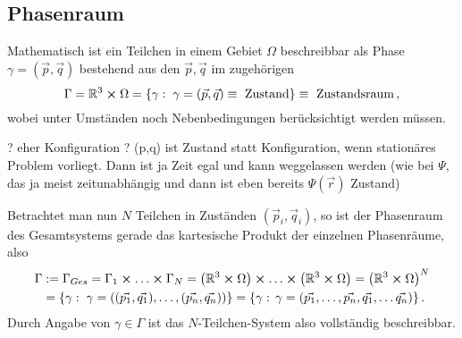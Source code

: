 \documentclass[../class_mech_main.tex]{subfiles}
\begin{document}
	\subsection{Phasenraum}
Mathematisch ist ein Teilchen in einem Gebiet $\Omega$ beschreibbar als Phase $\gamma = (\vec{p}, \vec{q})$ bestehend aus den  $\vec{p}, \vec{q}$ im zugehörigen 
\begin{equation}
\Gamma = \mathbb{R}^3 \cross \Omega = \qty{\gamma: \; \gamma = (\vec{p}, \vec{q}) \equiv \text{ Zustand}} \equiv \text{ Zustandsraum} \, ,
\end{equation}
wobei unter Umständen noch Nebenbedingungen berücksichtigt werden müssen.

? eher Konfiguration ? (p,q) ist Zustand statt Konfiguration, wenn stationäres Problem vorliegt. Dann ist ja Zeit egal und kann weggelassen werden (wie bei $\Psi$, das ja meist zeitunabhängig und dann ist eben bereits $\Psi(\vec{r})$ Zustand)



Betrachtet man nun $N$ Teilchen in Zuständen $(\vec{p}_i, \vec{q}_i)$, so ist der Phasenraum des Gesamtsystems gerade das kartesische Produkt der einzelnen Phasenräume, also
\begin{equation}
\begin{split}
\Gamma &:= \Gamma_{Ges} = \Gamma_1 \cross \dots \cross \Gamma_N = \qty(\mathbb{R}^3 \cross \Omega) \cross \dots \cross \qty(\mathbb{R}^3 \cross \Omega) = \qty(\mathbb{R}^3 \cross \Omega)^N
\\
&= \qty{\gamma: \; \gamma = \qty((\vec{p_1}, \vec{q_1}), \dots, (\vec{p_n}, \vec{q_n}))} = \qty{\gamma: \, \gamma = \qty(\vec{p_1}, \dots, \vec{p_n}, \vec{q_1}, \dots \vec{q_n})} \, .
\end{split}
\end{equation}
Durch Angabe von $\gamma \in \Gamma$ ist das $N$-Teilchen-System also vollständig beschreibbar.
\end{document}

